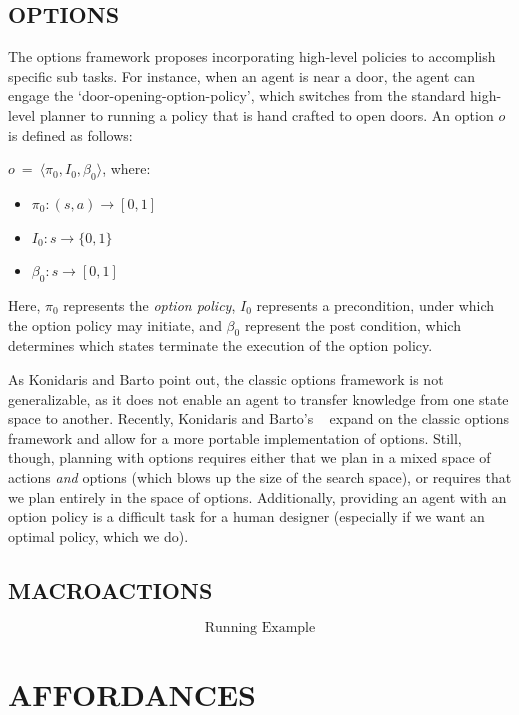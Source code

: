 \documentclass[]{article}
\begin{document}
\subsection{OPTIONS}

The options framework proposes incorporating high-level policies to 
accomplish specific sub tasks. For instance, when an agent is near 
a door, the agent can engage the `door-opening-option-policy', which 
switches from the standard high-level planner to running a policy 
that is hand crafted to open doors. An option $o$ is defined as follows:

$o\ =\ \langle \pi_0, I_0, \beta_0\rangle$, where:

\begin{itemize}
\item[] $\pi_0 : (s,a) \rightarrow [0,1]$
\item[] $I_0 : s \rightarrow \{0,1\}$
\item[] $\beta_0 : s \rightarrow [0,1]$
\end{itemize}

Here, $\pi_0$ represents the {\it option policy}, $I_0$ represents
a precondition, under which the option policy may initiate, and 
$\beta_0$ represent the post condition, which determines which 
states terminate the execution of the option policy.

As Konidaris and Barto point out, the classic options framework is not 
generalizable, as it does not enable an agent to transfer knowledge from 
one state space to another. Recently, Konidaris and Barto's ~\citep{konidaris07} 
expand on the classic options framework and allow for a more portable 
implementation of options. Still, though, planning with options requires either 
that we plan in a mixed space of actions {\it and} options (which blows up the 
size of the search space), or requires that we plan entirely in the space of options. 
Additionally, providing an agent with an option policy is a difficult task for a human 
designer (especially if we want an optimal policy, which we do).

\subsection{MACROACTIONS}

\[
\boxed{\text{Running Example}}
\]

\section{AFFORDANCES}
\end{document}
